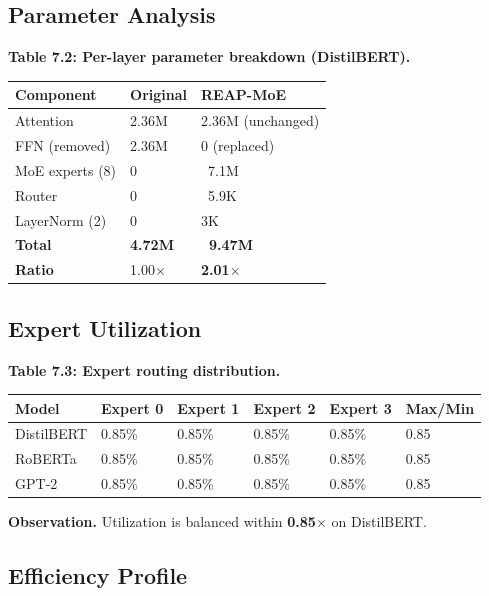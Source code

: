 \subsection{Parameter Analysis}

\textbf{Table 7.2: Per-layer parameter breakdown (DistilBERT).}

\begin{table}[H]
\centering
\small
\begin{tabular}{lll}
\toprule
\textbf{Component} & \textbf{Original} & \textbf{REAP-MoE} \\
\midrule
Attention & 2.36M & 2.36M (unchanged) \\
FFN (removed) & 2.36M & 0 (replaced) \\
MoE experts (8) & 0 & ~7.1M \\
Router & 0 & ~5.9K \\
LayerNorm (2) & 0 & 3K \\
\textbf{Total} & \textbf{4.72M} & \textbf{~9.47M} \\
\textbf{Ratio} & 1.00$\times$ & \textbf{2.01$\times$} \\
\bottomrule
\end{tabular}
\end{table}

\subsection{Expert Utilization}

\textbf{Table 7.3: Expert routing distribution.}

\begin{table}[H]
\centering
\small
\begin{tabular}{llllll}
\toprule
\textbf{Model} & \textbf{Expert 0} & \textbf{Expert 1} & \textbf{Expert 2} & \textbf{Expert 3} & \textbf{Max/Min} \\
\midrule
DistilBERT & 0.85\% & 0.85\% & 0.85\% & 0.85\% & 0.85 \\
RoBERTa & 0.85\% & 0.85\% & 0.85\% & 0.85\% & 0.85 \\
GPT-2 & 0.85\% & 0.85\% & 0.85\% & 0.85\% & 0.85 \\
\bottomrule
\end{tabular}
\end{table}

\textbf{Observation.} Utilization is balanced within \textbf{0.85$\times$} on DistilBERT.

\subsection{Efficiency Profile}

